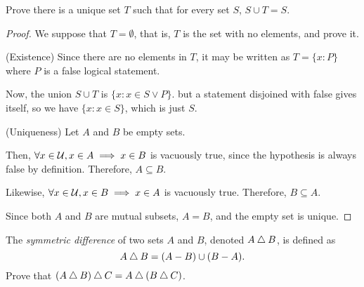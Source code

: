 \documentclass{agony}
\begin{document}
\question Prove there is a unique set $T$ such that for every set $S$, $S \cup T = S$.

\begin{proof}
  We suppose that $T=\emptyset$, that is, $T$ is the set with no elements, and prove it.

  (Existence) Since there are no elements in $T$, it may be written as $T=\{ x : P \}$
  where $P$ is a false logical statement.

  Now, the union $S \cup T$ is $\{ x : x \in S \lor P \}$.
  but a statement disjoined with false gives itself, so we have $\{ x : x \in S \}$, which is just $S$.

  (Uniqueness) Let $A$ and $B$ be empty sets.

  Then, $\forall x \in \mathcal{U}, x \in A \implies x \in B$ is vacuously true, since the hypothesis is always false by definition.
  Therefore, $A \subseteq B$.

  Likewise, $\forall x \in \mathcal{U}, x \in B \implies x \in A$ is vacuously true.
  Therefore, $B \subseteq A$.

  Since both $A$ and $B$ are mutual subsets, $A=B$, and the empty set is unique.
\end{proof}



\question The \emph{symmetric difference} of two sets $A$ and $B$, denoted $A \mathbin{\triangle} B$, is defined as
\[ A \mathbin{\triangle} B = (A-B) \cup (B-A). \]
Prove that $(A \mathbin{\triangle} B) \mathbin{\triangle} C = A \mathbin{\triangle} (B \mathbin{\triangle} C)$.
\end{document}
